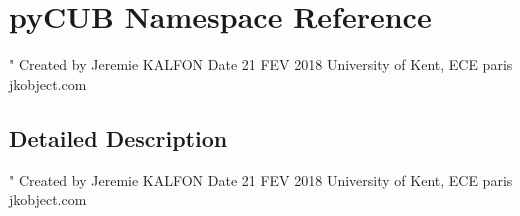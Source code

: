 \hypertarget{namespacepy_c_u_b}{}\section{py\+C\+UB Namespace Reference}
\label{namespacepy_c_u_b}


" Created by Jeremie K\+A\+L\+F\+ON Date 21 F\+EV 2018 University of Kent, E\+CE paris jkobject.\+com  




\subsection{Detailed Description}
" Created by Jeremie K\+A\+L\+F\+ON Date 21 F\+EV 2018 University of Kent, E\+CE paris jkobject.\+com 